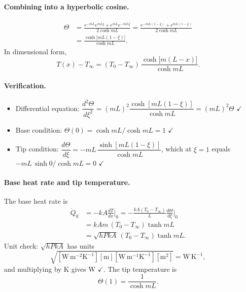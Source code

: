 \documentclass[reprint, amsmath, amssymb, aps, prl]{revtex4-2}
\newcommand{\Qdot}{\dot Q}
\newcommand{\WmK}{\mathrm{W\,m^{-1}K^{-1}}}
\newcommand{\WmmK}{\mathrm{W\,m^{-2}K^{-1}}}
\begin{document}
\paragraph*{Combining into a hyperbolic cosine.}
\begin{equation}
\begin{split}
\Theta&=\frac{e^{-mL}e^{mL\xi}+e^{mL}e^{-mL\xi}}{2\cosh mL}
=\frac{e^{-mL(1-\xi)}+e^{mL(1-\xi)}}{2\cosh mL}\\
&=\frac{\cosh\big[mL(1-\xi)\big]}{\cosh mL}.
\end{split}
\tag{4.41}
\end{equation}
In dimensional form,
\begin{equation*}
T(x)-T_\infty=(T_0-T_\infty)\,\frac{\cosh\big[m(L-x)\big]}{\cosh mL}.
\end{equation*}

\paragraph*{Verification.}
\begin{itemize}
\item Differential equation:
$\dfrac{d^2\Theta}{d\xi^2}=(mL)^2\dfrac{\cosh[mL(1-\xi)]}{\cosh mL}=(mL)^2\Theta$ $\checkmark$
\item Base condition: $\Theta(0)=\cosh mL/\cosh mL=1$ $\checkmark$
\item Tip condition: $\dfrac{d\Theta}{d\xi}=-mL\,\dfrac{\sinh[mL(1-\xi)]}{\cosh mL}$, which
at $\xi=1$ equals $-mL\,\sinh0/\cosh mL=0$ $\checkmark$
\end{itemize}

\paragraph*{Base heat rate and tip temperature.}
The base heat rate is
\begin{align*}
\Qdot_0&=-kA\frac{dT}{dx}\Big|_0=-\frac{kA(T_0-T_\infty)}{L}\frac{d\Theta}{d\xi}\Big|_0\\
&=kAm\,(T_0-T_\infty)\tanh mL\\
&=\sqrt{hPkA}\,(T_0-T_\infty)\tanh mL.
\end{align*}
Unit check: $\sqrt{hPkA}$ has units
\begin{equation*}
\sqrt{[\WmmK][\mathrm{m}][\WmK][\mathrm{m^2}]}=\mathrm{W\,K^{-1}},
\end{equation*}
and multiplying by K gives W $\checkmark$. The tip temperature is
\begin{equation*}
\Theta(1)=\frac{1}{\cosh mL}.
\end{equation*}
\end{document}
